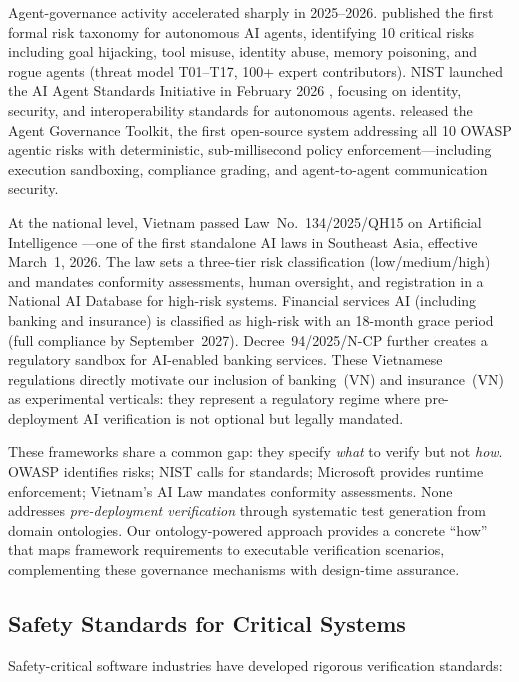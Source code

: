 \documentclass[11pt,a4paper]{article}
\begin{document}
Agent-governance activity accelerated sharply in 2025--2026.
\citet{owasp2025agentic} published the first formal risk taxonomy
for autonomous AI agents, identifying 10 critical risks including
goal hijacking, tool misuse, identity abuse, memory poisoning, and
rogue agents (threat model T01--T17, 100+ expert contributors).
NIST launched the AI Agent Standards Initiative in February 2026
\citep{nist2026agents}, focusing on identity, security, and
interoperability standards for autonomous agents.
\citet{microsoft2026agt} released the Agent Governance Toolkit,
the first open-source system addressing all 10 OWASP agentic risks
with deterministic, sub-millisecond policy enforcement---including
execution sandboxing, compliance grading, and agent-to-agent
communication security.

At the national level, Vietnam passed Law~No.~134/2025/QH15 on
Artificial Intelligence \citep{vnailaw2025}---one of the first
standalone AI laws in Southeast Asia, effective March~1, 2026. The
law sets a three-tier risk classification (low/medium/high) and
mandates conformity assessments, human oversight, and registration
in a National AI Database for high-risk systems.
Financial services AI (including banking and insurance) is
classified as high-risk with an 18-month grace period (full
compliance by September~2027). Decree~94/2025/N\DJ-CP
\citep{vnfintechsandbox2025} further creates a regulatory sandbox
for AI-enabled banking services. These Vietnamese
regulations directly motivate our inclusion of banking~(VN) and
insurance~(VN) as experimental verticals: they represent a
regulatory regime where pre-deployment AI verification is not
optional but legally mandated.

These frameworks share a common gap: they specify \emph{what} to
verify but not \emph{how}. OWASP identifies risks; NIST calls for
standards; Microsoft provides runtime enforcement; Vietnam's AI Law
mandates conformity assessments. None addresses \emph{pre-deployment
verification} through systematic test generation from domain
ontologies. Our ontology-powered approach provides a concrete ``how''
that maps framework requirements to executable verification
scenarios, complementing these governance mechanisms with
design-time assurance.

\subsection{Safety Standards for Critical Systems}

Safety-critical software industries have developed rigorous
verification standards:
\end{document}
